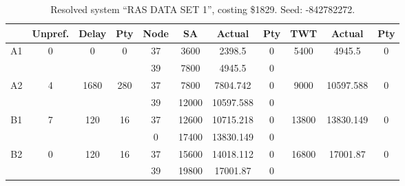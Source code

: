 \begin{sidewaystable}
\footnotesize
\caption{Resolved system ``RAS DATA SET 1'', costing \$1829. Seed: -842782272.}
\centering
\begin{tabular}{c||c|c|c||c|c|c|c||c|c|c}
  \hline \hline
  &
  Unpref. & 
  Delay &
  Pty &
  Node &
  SA &
  Actual &
  Pty &
  TWT &
  Actual &
  Pty \\
      \hline
      \multirow{2}{*}{A1} &
      \multirow{2}{*}{0} &
      \multirow{2}{*}{0} &
      \multirow{2}{*}{0} &
      37 &
      3600 &
        2398.5 &
        0 &
      \multirow{2}{*}{5400} &
        \multirow{2}{*}{4945.5} &
        \multirow{2}{*}{0}
      \\
      \cline{5-8}
       &
       &
       &
       &
      39 &
      7800 &
        4945.5 &
        0 &
      
         &
        
      \\
      \hline
      \multirow{2}{*}{A2} &
      \multirow{2}{*}{4} &
      \multirow{2}{*}{1680} &
      \multirow{2}{*}{280} &
      37 &
      7800 &
        7804.742 &
        0 &
      \multirow{2}{*}{9000} &
        \multirow{2}{*}{10597.588} &
        \multirow{2}{*}{0}
      \\
      \cline{5-8}
       &
       &
       &
       &
      39 &
      12000 &
        10597.588 &
        0 &
      
         &
        
      \\
      \hline
      \multirow{2}{*}{B1} &
      \multirow{2}{*}{7} &
      \multirow{2}{*}{120} &
      \multirow{2}{*}{16} &
      37 &
      12600 &
        10715.218 &
        0 &
      \multirow{2}{*}{13800} &
        \multirow{2}{*}{13830.149} &
        \multirow{2}{*}{0}
      \\
      \cline{5-8}
       &
       &
       &
       &
      0 &
      17400 &
        13830.149 &
        0 &
      
         &
        
      \\
      \hline
      \multirow{2}{*}{B2} &
      \multirow{2}{*}{0} &
      \multirow{2}{*}{120} &
      \multirow{2}{*}{16} &
      37 &
      15600 &
        14018.112 &
        0 &
      \multirow{2}{*}{16800} &
        \multirow{2}{*}{17001.87} &
        \multirow{2}{*}{0}
      \\
      \cline{5-8}
       &
       &
       &
       &
      39 &
      19800 &
        17001.87 &
        0 &
      

\end{tabular}
\end{sidewaystable}
